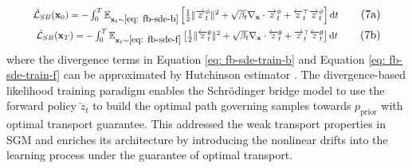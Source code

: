\begin{align}
\scalebox{0.85}{$
    \Tilde{\mathcal{L}}_{SB}(\mathbf{x}_0) = - \int_{0}^{T}\E_{\mathbf{x}_t\sim \ref{eq: fb-sde-b}}\left[ \frac{1}{2}\|\overrightarrow{z}_t^\phi\|^2 + \sqrt{\beta_t}\nabla_{\mathbf{x}} \cdot\overrightarrow{z}_t^\phi + \overleftarrow{z}_t^\top\overrightarrow{z}_t^\phi\right] \mathrm{d}t
    $} \tag{7a}\label{eq: fb-sde-train-b}\\
\scalebox{0.85}{$
    \Tilde{\mathcal{L}}_{SB}(\mathbf{x}_T) = - \int_{0}^{T}\E_{\mathbf{x}_t\sim \ref{eq: fb-sde-f}}\left[ \frac{1}{2}\|\overleftarrow{z}_t^\theta\|^2 + \sqrt{\beta_t}\nabla_{\mathbf{x}} \cdot\overleftarrow{z}_t^\theta + \overrightarrow{z}_t^\top\overleftarrow{z}_t^\theta\right] \mathrm{d}t 
$}\tag{7b}\label{eq: fb-sde-train-f}
\end{align}
where the divergence terms in Equation \ref{eq: fb-sde-train-b} and Equation \ref{eq: fb-sde-train-f} can be approximated by Hutchinson estimator \citep{Hutchinson89}.
The divergence-based likelihood training paradigm enables the Schrödinger bridge model to use the forward policy $\overleftarrow{z}_t$ to build the optimal path governing samples towards $p_{\text{prior}}$ with optimal transport guarantee.
This addressed the weak transport properties in SGM and enriches its architecture by introducing the nonlinear drifts into the learning process under the guarantee of optimal transport. 








